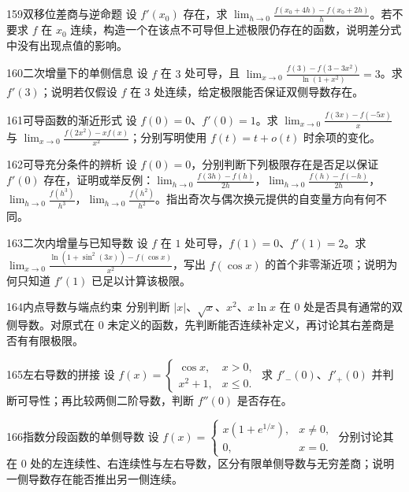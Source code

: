\begin{exercise}{159}{双移位差商与逆命题}
设 $f'(x_0)$ 存在，求 $\lim_{h\to0}\frac{f(x_0+4h)-f(x_0+2h)}h$。若不要求 $f$ 在 $x_0$ 连续，构造一个在该点不可导但上述极限仍存在的函数，说明差分式中没有出现点值的影响。
\end{exercise}
\begin{exercise}{160}{二次增量下的单侧信息}
设 $f$ 在 $3$ 处可导，且 $\lim_{x\to0}\frac{f(3)-f(3-3x^2)}{\ln(1+x^2)}=3$。求 $f'(3)$；说明若仅假设 $f$ 在 $3$ 处连续，给定极限能否保证双侧导数存在。
\end{exercise}
\begin{exercise}{161}{可导函数的渐近形式}
设 $f(0)=0$、$f'(0)=1$。求 $\lim_{x\to0}\frac{f(3x)-f(-5x)}x$ 与 $\lim_{x\to0}\frac{f(2x^2)-xf(x)}{x^2}$；分别写明使用 $f(t)=t+o(t)$ 时余项的变化。
\end{exercise}
\begin{exercise}{162}{可导充分条件的辨析}
设 $f(0)=0$，分别判断下列极限存在是否足以保证 $f'(0)$ 存在，证明或举反例：$\lim_{h\to0}\frac{f(3h)-f(h)}{2h}$，$\lim_{h\to0}\frac{f(h)-f(-h)}{2h}$，$\lim_{h\to0}\frac{f(h^3)}{h^3}$，$\lim_{h\to0}\frac{f(h^2)}{h^2}$。指出奇次与偶次换元提供的自变量方向有何不同。
\end{exercise}
\begin{exercise}{163}{二次内增量与已知导数}
设 $f$ 在 $1$ 处可导，$f(1)=0$、$f'(1)=2$。求 $\lim_{x\to0}\frac{\ln(1+\sin^2(3x))-f(\cos x)}{x^2}$，写出 $f(\cos x)$ 的首个非零渐近项；说明为何只知道 $f'(1)$ 已足以计算该极限。
\end{exercise}
\begin{exercise}{164}{内点导数与端点约束}
分别判断 $|x|$、$\sqrt x$、$x^2$、$x\ln x$ 在 $0$ 处是否具有通常的双侧导数。对原式在 $0$ 未定义的函数，先判断能否连续补定义，再讨论其右差商是否有有限极限。
\end{exercise}
\begin{exercise}{165}{左右导数的拼接}
设 $f(x)=\begin{cases}\cos x,&x>0,\\x^2+1,&x\le0.\end{cases}$ 求 $f'_-(0)$、$f'_+(0)$ 并判断可导性；再比较两侧二阶导数，判断 $f''(0)$ 是否存在。
\end{exercise}
\begin{exercise}{166}{指数分段函数的单侧导数}
设 $f(x)=\begin{cases}x(1+e^{1/x}),&x\ne0,\\0,&x=0.\end{cases}$ 分别讨论其在 $0$ 处的左连续性、右连续性与左右导数，区分有限单侧导数与无穷差商；说明一侧导数存在能否推出另一侧连续。
\end{exercise}
